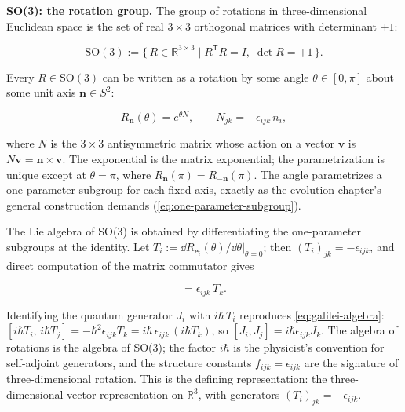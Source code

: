 \medskip\noindent\textbf{SO(3): the rotation group.} The group of rotations in three-dimensional Euclidean space is the set of real $3\times3$ orthogonal matrices with determinant $+1$:
\begin{linenomath}
    \begin{equation}
        \mathrm{SO}(3) := \{\,R\in\mathbb{R}^{3\times3}\mid R^{\mathsf{T}}R = I,\;\det R = +1\,\}.
    \end{equation}
\end{linenomath}
Every $R\in\mathrm{SO}(3)$ can be written as a rotation by some angle $\theta\in[0,\pi]$ about some unit axis $\bm n\in S^2$:
\begin{linenomath}
    \begin{equation}
        R_{\bm n}(\theta) = e^{\theta N},\qquad N_{jk} = -\epsilon_{ijk}\,n_i,
        \label{eq:so3-param}
    \end{equation}
\end{linenomath}
where $N$ is the $3\times3$ antisymmetric matrix whose action on a vector $\bm v$ is $N\bm v = \bm n\times\bm v$. The exponential is the matrix exponential; the parametrization is unique except at $\theta=\pi$, where $R_{\bm n}(\pi)=R_{-\bm n}(\pi)$. The angle parametrizes a one-parameter subgroup for each fixed axis, exactly as the evolution chapter's general construction demands (\eqref{eq:one-parameter-subgroup}).

The Lie algebra of SO(3) is obtained by differentiating the one-parameter subgroups at the identity. Let $T_i := \dd R_{\bm e_i}(\theta)/\dd\theta\big|_{\theta=0}$; then $(T_i)_{jk} = -\epsilon_{ijk}$, and direct computation of the matrix commutator gives
\begin{linenomath}
    \begin{equation}
        [T_i,T_j] = \epsilon_{ijk}\,T_k.
    \end{equation}
\end{linenomath}
Identifying the quantum generator $J_i$ with $i\hbar\,T_i$ reproduces \eqref{eq:galilei-algebra}: $[i\hbar T_i,\, i\hbar T_j] = -\hbar^2\epsilon_{ijk}T_k = i\hbar\,\epsilon_{ijk}\,(i\hbar T_k)$, so $[J_i,J_j]=i\hbar\epsilon_{ijk}J_k$. The algebra of rotations is the algebra of SO(3); the factor $i\hbar$ is the physicist's convention for self-adjoint generators, and the structure constants $f_{ijk}=\epsilon_{ijk}$ are the signature of three-dimensional rotation. This is the defining representation: the three-dimensional vector representation on $\mathbb{R}^3$, with generators $(T_i)_{jk}=-\epsilon_{ijk}$.

